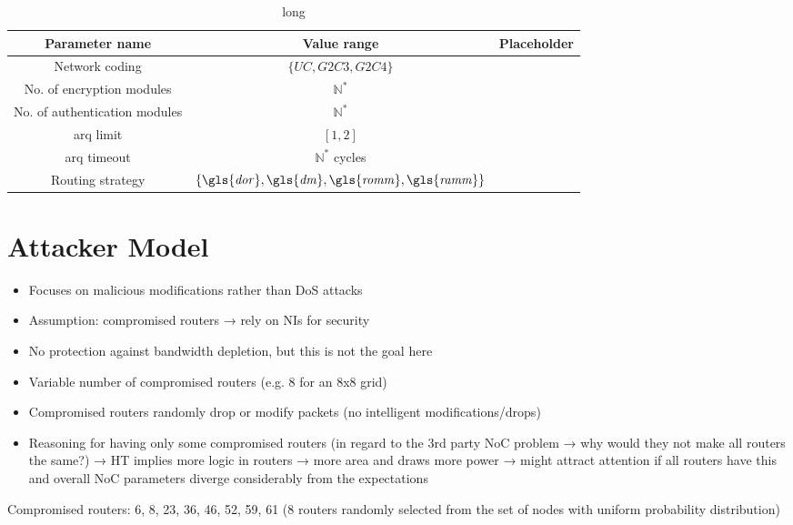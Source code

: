 \begin{table}
    \centering
    \begin{tabulary}{\textwidth}{C|C|C}
        Parameter name & Value range & Placeholder \\\hline
        Network coding & $\{\mathit{UC}, \mathit{G2C3}, \mathit{G2C4}\}$ & \pNCMode{} \\
        No. of encryption modules & $\mathbb{N}^*$ & \pEncMods{} \\
        No. of authentication modules & $\mathbb{N}^*$ & \pAuthMods{} \\
        \Gls{arq} limit & $[1, 2]$ & \pARQLimit{} \\
        \Gls{arq} timeout & $\mathbb{N}^*$ cycles & \pARQTimeout{} \\
        Routing strategy & $\{\mathit{\gls{dor}}, \mathit{\gls{dm}}, \mathit{\gls{romm}}, \mathit{\gls{ramm}}\}$ & \pRStrat{} \\
    \end{tabulary}
    \caption[short]{long}
    \label{tab:inputparams}
\end{table}%

\section{Attacker Model}
\begin{itemize}
    \item Focuses on malicious modifications rather than DoS attacks
    \item Assumption: compromised routers → rely on NIs for security
    \item No protection against bandwidth depletion, but this is not the goal here
    \item Variable number of compromised routers (e.g. 8 for an 8x8 grid)
    \item Compromised routers randomly drop or modify packets (no intelligent modifications/drops)
    \item Reasoning for having only some compromised routers (in regard to the 3rd party NoC problem → why would they not make all routers the same?)
        → HT implies more logic in routers → more area and draws more power → might attract attention if all routers have this and overall NoC
        parameters diverge considerably from the expectations
\end{itemize}

Compromised routers: 6, 8, 23, 36, 46, 52, 59, 61 (8 routers randomly selected from the set of nodes with uniform probability distribution)

